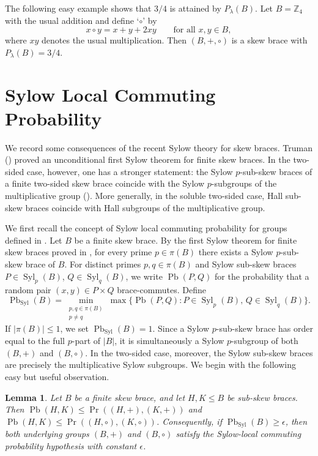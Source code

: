 \documentclass[11pt, oneside]{amsart}
\numberwithin{equation}{section}
\theoremstyle{plain}
\newtheorem{lem}[equation]{Lemma}
\theoremstyle{definition}
\newcommand{\Pb}{\operatorname{Pb} }
\renewcommand{\Pr}{\operatorname{Pr} }
\newcommand{\Syl}{\operatorname{Syl} }
\begin{document}
The following easy example shows that $3/4$ is attained by
$P_{\lambda}(B)$. Let $B=\mathbb{Z}_4$ with the usual addition and define
`$\circ$' by
$$
x\circ y=x+y+2xy
\qquad\mbox{for all }x,y\in B,
$$
where $xy$ denotes the usual multiplication. Then $(B,+,\circ)$ is a
skew brace with
$P_{\lambda}(B)=3/4$.






\section{Sylow Local Commuting Probability}

We record some consequences of the recent Sylow theory for skew braces.
Truman (\cite{Tru26}) proved an unconditional first Sylow theorem for finite skew braces. In the two-sided case, however, one has a stronger statement:
 the Sylow $p$-sub-skew braces of a finite
two-sided skew brace coincide with the Sylow $p$-subgroups of the
multiplicative group (\cite[Theorem 14]{CDMFT26}). More generally, in the soluble two-sided case, Hall sub-skew braces coincide with Hall subgroups of the multiplicative group.

We first recall the concept of Sylow local commuting probability for groups defined in \cite{DLMS25}. Let $B$ be a finite skew brace. By the first Sylow theorem for finite skew braces proved in \cite{Tru26}, for every prime $p\in\pi(B)$ there exists a Sylow $p$-sub-skew brace of $B$. For distinct primes
$p,q\in\pi(B)$ and Sylow sub-skew braces $P\in\Syl_p(B)$,
$Q\in\Syl_q(B)$, we write $\Pb(P,Q)$ for the probability that a random
pair $(x,y)\in P\times Q$ brace-commutes. Define
\[
\Pb_{\Syl}(B)=
\min_{\substack{p,q\in\pi(B)\\p\neq q}}
\max\{\Pb(P,Q):P\in\Syl_p(B),\,Q\in\Syl_q(B)\}.
\]
If $|\pi(B)|\leqslant 1$, we set $\Pb_{\Syl}(B)=1$. Since a Sylow $p$-sub-skew brace has order equal to the full $p$-part of $|B|$, it is simultaneously a Sylow $p$-subgroup of both $(B,+)$ and $(B,\circ)$. In the two-sided case, moreover, the Sylow sub-skew braces are precisely the multiplicative Sylow subgroups. We begin with the following easy but useful observation.

\begin{lem}\label{lem:sylow-brace-prob-to-groups}
Let $B$ be a finite skew brace, and let $H,K\leqslant B$ be sub-skew braces.
Then
$\Pb(H,K)\leqslant \Pr((H,+),(K,+))$ and
$\Pb(H,K)\leqslant \Pr((H,\circ),(K,\circ))$.
Consequently, if $\Pb_{\Syl}(B)\geqslant\epsilon$, then
both underlying groups $(B,+)$ and $(B,\circ)$ satisfy the Sylow-local
commuting probability hypothesis with constant $\epsilon$.
\end{lem}
\end{document}
